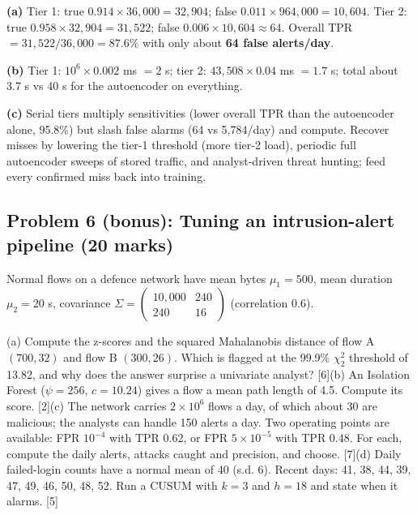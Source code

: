 \documentclass[11pt]{article}
\begin{document}
\begin{soln}\textbf{(a)} Tier 1: true $0.914\times36{,}000=32{,}904$; false $0.011\times964{,}000=10{,}604$. Tier 2: true $0.958\times32{,}904=31{,}522$; false $0.006\times10{,}604\approx64$. Overall TPR $=31{,}522/36{,}000=\mathbf{87.6\%}$ with only about \textbf{64 false alerts/day}.

\textbf{(b)} Tier 1: $10^6\times0.002$ ms $=2$ s; tier 2: $43{,}508\times0.04$ ms $=1.7$ s; total about 3.7 s vs 40 s for the autoencoder on everything.

\textbf{(c)} Serial tiers multiply sensitivities (lower overall TPR than the autoencoder alone, 95.8\%) but slash false alarms (64 vs 5,784/day) and compute. Recover misses by lowering the tier-1 threshold (more tier-2 load), periodic full autoencoder sweeps of stored traffic, and analyst-driven threat hunting; feed every confirmed miss back into training.\end{soln}

\subsection{Problem 6 (bonus): Tuning an intrusion-alert pipeline \normalfont\small\color{GreyN}(20 marks)}

\begin{prob}Normal flows on a defence network have mean bytes $\mu_1=500$, mean duration $\mu_2=20$ s, covariance $\Sigma=\begin{pmatrix}10{,}000&240\\240&16\end{pmatrix}$ (correlation 0.6).

(a) Compute the z-scores and the squared Mahalanobis distance of flow A $(700, 32)$ and flow B $(300, 26)$. Which is flagged at the 99.9\% $\chi^2_2$ threshold of 13.82, and why does the answer surprise a univariate analyst? [6]\newline (b) An Isolation Forest ($\psi=256$, $c=10.24$) gives a flow a mean path length of 4.5. Compute its score. [2]\newline (c) The network carries $2\times10^6$ flows a day, of which about 30 are malicious; the analysts can handle 150 alerts a day. Two operating points are available: FPR $10^{-4}$ with TPR 0.62, or FPR $5\times10^{-5}$ with TPR 0.48. For each, compute the daily alerts, attacks caught and precision, and choose. [7]\newline (d) Daily failed-login counts have a normal mean of 40 (s.d. 6). Recent days: 41, 38, 44, 39, 47, 49, 46, 50, 48, 52. Run a CUSUM with $k=3$ and $h=18$ and state when it alarms. [5]\end{prob}
\end{document}
